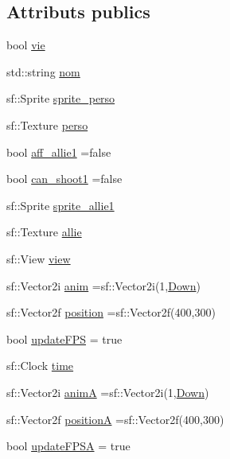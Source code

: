 \subsection*{Attributs publics}
\begin{DoxyCompactItemize}
\item 
bool \hyperlink{class_nav_a57807c54c5dc53beebce07c2d626cd43}{vie}
\item 
std\+::string \hyperlink{class_nav_af809c7fbbdfdee3a6cfc2151f8fc1e41}{nom}
\item 
sf\+::\+Sprite \hyperlink{class_nav_a6a14afd015bebcb30767bc60de20dde7}{sprite\+\_\+perso}
\item 
sf\+::\+Texture \hyperlink{class_nav_a546e6ebedbfb271ea7070cce2cfcaa7f}{perso}
\item 
bool \hyperlink{class_nav_a5847e7ce67da84ebd4a9c573c296130f}{aff\+\_\+allie1} =false
\item 
bool \hyperlink{class_nav_a043c88faeaccbaa50b3ac62e4a5ac9e8}{can\+\_\+shoot1} =false
\item 
sf\+::\+Sprite \hyperlink{class_nav_a7fd1b2f3e91bda41432ae8638eed802e}{sprite\+\_\+allie1}
\item 
sf\+::\+Texture \hyperlink{class_nav_a055298afaad86874d561bfcebaa02c63}{allie}
\item 
sf\+::\+View \hyperlink{class_nav_ac7f11f43ef94d2a0491c0ec7bf0a6e1b}{view}
\item 
sf\+::\+Vector2i \hyperlink{class_nav_ae0e15b708bdcda1b96cac062f85aae84}{anim} =sf\+::\+Vector2i(1,\hyperlink{class_nav_a08a9562b15243f3e42d98588db65090ea2b91c812608ee39ea6dca48340e5b213}{Down})
\item 
sf\+::\+Vector2f \hyperlink{class_nav_ae2c6a22f80dd0532d679a3ff921c8990}{position} =sf\+::\+Vector2f(400,300)
\item 
bool \hyperlink{class_nav_a47c891b239ec0f1be55573ca4d2a6473}{update\+F\+PS} = true
\item 
sf\+::\+Clock \hyperlink{class_nav_a4db5ddb6de6409c35c924b3938ffdc60}{time}
\item 
sf\+::\+Vector2i \hyperlink{class_nav_ae8ee5f25cef0d0877d9af9a5cda0284b}{animA} =sf\+::\+Vector2i(1,\hyperlink{class_nav_a08a9562b15243f3e42d98588db65090ea2b91c812608ee39ea6dca48340e5b213}{Down})
\item 
sf\+::\+Vector2f \hyperlink{class_nav_a2507d20e69ae0ac8e929004a6dd737d3}{positionA} =sf\+::\+Vector2f(400,300)
\item 
bool \hyperlink{class_nav_a8dab5ad66c36689415fa90aa058c0aa7}{update\+F\+P\+SA} = true
\end{DoxyCompactItemize}



